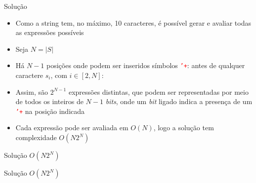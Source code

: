 \begin{frame}[fragile]{Solução}

    \begin{itemize}
        \item Como a string tem, no máximo, 10 caracteres, é possível gerar e avaliar todas as
            expressões possíveis

        \item Seja $N = |S|$

        \item Há $N - 1$ posições onde podem ser inseridos símbolos \texttt{\textcolor{red}{'+}}:
            antes de qualquer caractere $s_i$, com $i\in [2, N]$:

        \item Assim, são $2^{N - 1}$ expressões distintas, que podem ser representadas por meio de
            todos os inteiros de $N - 1$ \textit{bits}, onde um \textit{bit} ligado indica
            a presença de um \texttt{\textcolor{red}{'+}} na posição indicada

        \item Cada expressão pode ser avaliada em $O(N)$, logo a solução tem complexidade
            $O(N2^N)$
    
    \end{itemize}

\end{frame}

\begin{frame}[fragile]{Solução $O(N2^N)$}
\end{frame}

\begin{frame}[fragile]{Solução $O(N2^N)$}
\end{frame}
